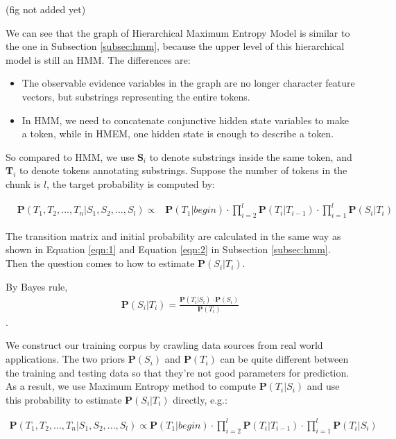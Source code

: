 (fig not added yet)

We can see that the graph of Hierarchical Maximum Entropy Model is
similar to the one in Subsection \ref{subsec:hmm}, because the upper
level of this hierarchical model is still an HMM. The differences
are:

\begin{itemize}
\item The observable evidence variables in the graph are no longer
character feature vectors, but substrings representing the entire
tokens.
\item In HMM, we need to concatenate conjunctive hidden state
variables to make a token, while in HMEM, one hidden state is enough
to describe a token.
\end{itemize}

So compared to HMM, we use $\mathbf{S}_i$ to denote substrings
inside the same token, and $\mathbf{T}_i$ to denote tokens annotating
substrings. Suppose the number of tokens in the chunk is $l$, the
target probability is computed by:

\begin{eqnarray*}
& \mathbf{P}(T_1, T_2, ..., T_n|S_1, S_2, ..., S_l)  \propto &
\mathbf{P}(T_1|begin) \cdot \prod_{i=2}^{l}{\mathbf{P}(T_i|T_{i-1})}
\cdot \prod_{i=1}^{l}\mathbf{P}(S_i|T_i)
\end{eqnarray*}

The transition matrix and initial probability are calculated in the
same way as shown in Equation \ref{eqn:1} and Equation \ref{eqn:2}
in Subsection \ref{subsec:hmm}. Then the question comes to how to
estimate $\mathbf{P}(S_i|T_i)$.

By Bayes rule,
\begin{eqnarray*}
\mathbf{P}(S_i|T_i) = \frac{\mathbf{P}(T_i|S_i) \cdot
\mathbf{P}(S_i)}{\mathbf{P}(T_i)}
\end{eqnarray*}.

We construct our training corpus by crawling data sources from real
world applications. The two priors $\mathbf{P}(S_i)$ and
$\mathbf{P}(T_i)$ can be quite different between the training and
testing data so that they're not good parameters for prediction. As
a result, we use Maximum Entropy method to compute
$\mathbf{P}(T_i|S_i)$ and use this probability to estimate
$\mathbf{P}(S_i|T_i)$ directly, e.g.:

\begin{eqnarray*}
\mathbf{P}(T_1, T_2, ..., T_n|S_1, S_2, ..., S_l) \propto
\mathbf{P}(T_1|begin) \cdot \prod_{i=2}^{l}\mathbf{P}(T_i|T_{i-1})
\cdot \prod_{i=1}^{l}\mathbf{P}(T_i|S_i)
\end{eqnarray*}

